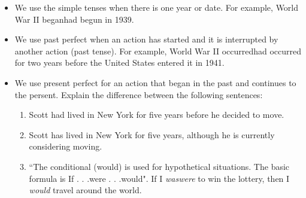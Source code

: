 \begin{itemize}
\item{We use the simple tenses when there is one year or date. For example, World War II
began\/had begun in 1939.}
\item{We use past perfect when an action has started and it is interrupted by another action (past
tense). For example, World War II occurred\/had occurred for two years before the United
States entered it in 1941.}
\item{We use present perfect for an action that began in the past and continues to the persent.
Explain the difference between the following sentences:}

\begin{enumerate}
\item{Scott had lived in New York for five years before he decided to move.}
\item{Scott has lived in New York for five years, although he is currently considering moving.}
\item{``The conditional (would) is used for hypothetical situations. The basic formula is \/If . . .were
. . .would". If I \textit{was\/were} to win the lottery, then I \textit{would} travel around the world.}
\end{enumerate}

\end{itemize}
